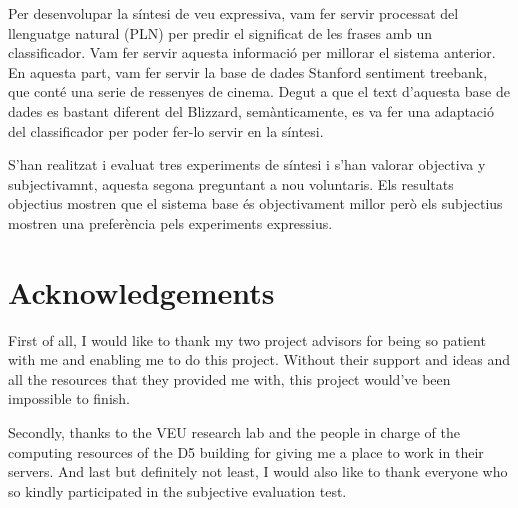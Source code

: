Per desenvolupar la síntesi de veu  expressiva, vam fer servir processat del llenguatge natural (PLN) per predir el significat de les frases amb un classificador. Vam fer servir aquesta informació per millorar el sistema anterior. En aquesta part, vam fer servir la base de dades Stanford sentiment treebank, que conté una serie de ressenyes de cinema. Degut a que el text d'aquesta base de dades es bastant diferent del Blizzard, semànticamente, es va fer una adaptació del classificador per poder fer-lo servir en la síntesi.

S'han realitzat i evaluat tres experiments de síntesi i s'han valorar objectiva y subjectivamnt, aquesta segona preguntant a nou voluntaris. Els resultats objectius mostren que el sistema base és objectivament millor però els subjectius mostren una preferència pels experiments expressius.


\chapter*{Acknowledgements}

First of all, I would like to thank my two project advisors for being so patient with me and enabling me to do this project. Without their support and ideas and all the resources that they provided me with, this project would've been impossible to finish.

Secondly, thanks to the VEU research lab and the people in charge of the computing resources of the D5 building for giving me a place to work in their servers. And last but definitely not least, I would also like to thank everyone who so kindly participated in the subjective evaluation test.
